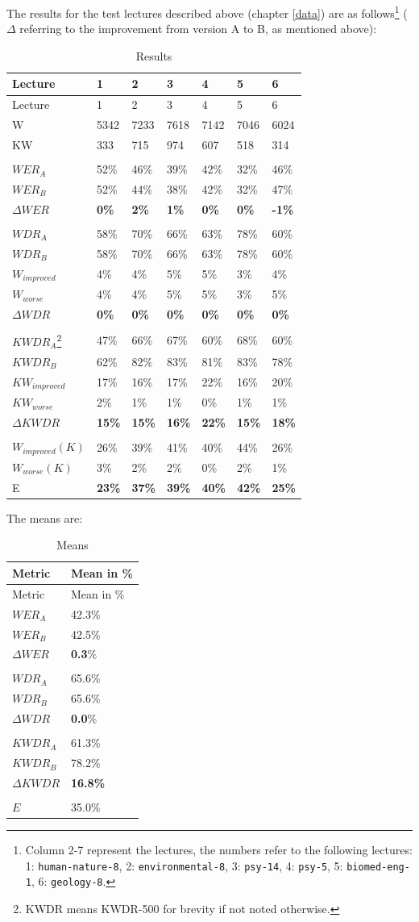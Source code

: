 \documentclass[]{article}
\begin{document}
The results for the test lectures described above (chapter \ref{data})
are as follows\footnote{Column 2-7 represent the lectures, the numbers
  refer to the following lectures: 1: \texttt{human-nature-8}, 2:
  \texttt{environmental-8}, 3: \texttt{psy-14}, 4: \texttt{psy-5}, 5:
  \texttt{biomed-eng-1}, 6: \texttt{geology-8}.} (\(\Delta\) referring
to the improvement from version A to B, as mentioned above):

\small{}

\begin{longtable}[c]{@{}lllllll@{}}
\caption{Results}\tabularnewline
\toprule
Lecture & 1 & 2 & 3 & 4 & 5 & 6\tabularnewline
\midrule
\endfirsthead
\toprule
Lecture & 1 & 2 & 3 & 4 & 5 & 6\tabularnewline
\midrule
\endhead
W & 5342 & 7233 & 7618 & 7142 & 7046 & 6024\tabularnewline
KW & 333 & 715 & 974 & 607 & 518 & 314\tabularnewline
& & & & &\tabularnewline
\(WER_A\) & 52\% & 46\% & 39\% & 42\% & 32\% & 46\%\tabularnewline
\(WER_B\) & 52\% & 44\% & 38\% & 42\% & 32\% & 47\%\tabularnewline
\(\Delta WER\) & \textbf{0\%} & \textbf{2\%} & \textbf{1\%} &
\textbf{0\%} & \textbf{0\%} & \textbf{-1\%}\tabularnewline
& & & & &\tabularnewline
\(WDR_A\) & 58\% & 70\% & 66\% & 63\% & 78\% & 60\%\tabularnewline
\(WDR_B\) & 58\% & 70\% & 66\% & 63\% & 78\% & 60\%\tabularnewline
\(W_{improved}\) & 4\% & 4\% & 5\% & 5\% & 3\% & 4\%\tabularnewline
\(W_{worse}\) & 4\% & 4\% & 5\% & 5\% & 3\% & 5\%\tabularnewline
\(\Delta WDR\) & \textbf{0\%} & \textbf{0\%} & \textbf{0\%} &
\textbf{0\%} & \textbf{0\%} & \textbf{0\%}\tabularnewline
& & & & &\tabularnewline
\(KWDR_A\)\footnote{KWDR means KWDR-500 for brevity if not noted
  otherwise.} & 47\% & 66\% & 67\% & 60\% & 68\% & 60\%\tabularnewline
\(KWDR_B\) & 62\% & 82\% & 83\% & 81\% & 83\% & 78\%\tabularnewline
\(KW_{improved}\) & 17\% & 16\% & 17\% & 22\% & 16\% &
20\%\tabularnewline
\(KW_{worse}\) & 2\% & 1\% & 1\% & 0\% & 1\% & 1\%\tabularnewline
\(\Delta KWDR\) & \textbf{15\%} & \textbf{15\%} & \textbf{16\%} &
\textbf{22\%} & \textbf{15\%} & \textbf{18\%}\tabularnewline
& & & & &\tabularnewline
\(W_{improved}(K)\) & 26\% & 39\% & 41\% & 40\% & 44\% &
26\%\tabularnewline
\(W_{worse}(K)\) & 3\% & 2\% & 2\% & 0\% & 2\% & 1\%\tabularnewline
E & \textbf{23\%} & \textbf{37\%} & \textbf{39\%} & \textbf{40\%} &
\textbf{42\%} & \textbf{25\%}\tabularnewline
\bottomrule
\end{longtable}

\normalsize{}

The means are:

\begin{longtable}[c]{@{}ll@{}}
\caption{Means}\tabularnewline
\toprule
Metric & Mean in \%\tabularnewline
\midrule
\endfirsthead
\toprule
Metric & Mean in \%\tabularnewline
\midrule
\endhead
\(WER_A\) & 42.3\%\tabularnewline
\(WER_B\) & 42.5\%\tabularnewline
\(\Delta WER\) & \textbf{0.3}\%\tabularnewline
&\tabularnewline
\(WDR_A\) & 65.6\%\tabularnewline
\(WDR_B\) & 65.6\%\tabularnewline
\(\Delta WDR\) & \textbf{0.0}\%\tabularnewline
&\tabularnewline
\(KWDR_A\) & 61.3\%\tabularnewline
\(KWDR_B\) & 78.2\%\tabularnewline
\(\Delta KWDR\) & \textbf{16.8\%}\tabularnewline
&\tabularnewline
\(E\) & 35.0\%\tabularnewline
\bottomrule
\end{longtable}
\end{document}
